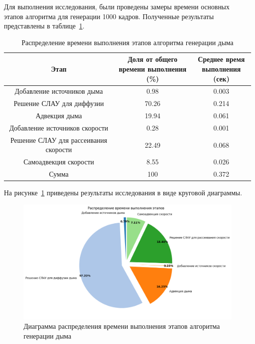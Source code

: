 Для выполнения исследования, были проведены замеры времени основных этапов алгоритма для генерации 1000 кадров. Полученные результаты представлены в таблице~\ref{tab:no_parallel}.

\begin{table}[H]
	\caption{Распределение времени выполнения этапов алгоритма генерации дыма}
	\label{tab:no_parallel}
	\centering
	\begin{tabular}{|c|c|c|}
		\hline
		Этап&\shortstack{Доля от общего\\времени выполнения (\%)}&\shortstack{Среднее время\\ выполнения (сек)}\\\hline
		Добавление источников дыма&0.98&0.003\\\hline
		Решение СЛАУ для диффузии &70.26&0.214\\\hline
		Адвекция дыма&19.94&0.061\\\hline
		Добавление источников скорости&0.28&0.001\\\hline
		Решение СЛАУ для рассеивания скорости&22.49&0.068\\\hline
		Самоадвекция скорости&8.55&0.026\\\hline\hline
		Сумма&100&	0.372\\\hline
	\end{tabular}
\end{table}

На рисунке~\ref{fig:no_parallel} приведены результаты исследования в виде круговой диаграммы.

\begin{figure}[H]
	\centering
	\includegraphics[width=1.0\textwidth,page=1]{assets/img/pie.png}
	\caption{Диаграмма распределения времени выполнения этапов алгоритма генерации дыма}
	\label{fig:no_parallel}
\end{figure}

